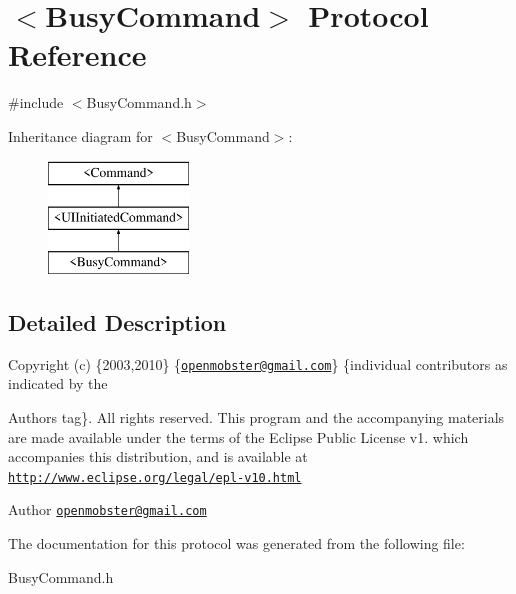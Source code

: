 \hypertarget{protocol_busy_command-p}{
\section{$<$\-Busy\-Command$>$ \-Protocol \-Reference}
\label{protocol_busy_command-p}
}


{\ttfamily \#include $<$\-Busy\-Command.\-h$>$}

\-Inheritance diagram for $<$\-Busy\-Command$>$\-:\begin{figure}[H]
\begin{center}
\leavevmode
\includegraphics[height=3.000000cm]{protocol_busy_command-p}
\end{center}
\end{figure}


\subsection{\-Detailed \-Description}
\-Copyright (c) \{2003,2010\} \{\href{mailto:openmobster@gmail.com}{\tt openmobster@gmail.\-com}\} \{individual contributors as indicated by the \begin{DoxyAuthor}{\-Authors}
tag\}. \-All rights reserved. \-This program and the accompanying materials are made available under the terms of the \-Eclipse \-Public \-License v1. which accompanies this distribution, and is available at \href{http://www.eclipse.org/legal/epl-v10.html}{\tt http\-://www.\-eclipse.\-org/legal/epl-\/v10.\-html}
\end{DoxyAuthor}
\begin{DoxyAuthor}{\-Author}
\href{mailto:openmobster@gmail.com}{\tt openmobster@gmail.\-com} 
\end{DoxyAuthor}


\-The documentation for this protocol was generated from the following file\-:\begin{DoxyCompactItemize}
\item 
\-Busy\-Command.\-h\end{DoxyCompactItemize}
